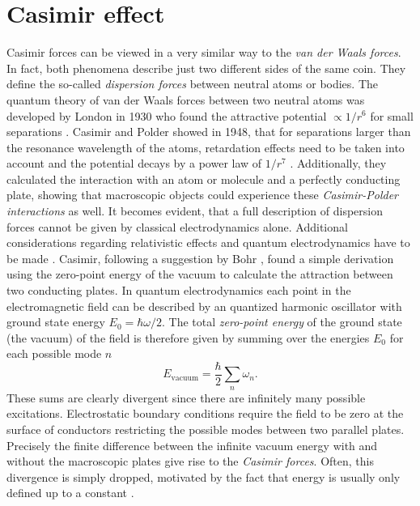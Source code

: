 \chapter{Casimir effect}\label{cha:casimir-effect}

Casimir forces can be viewed in a very similar way to the \textit{van der Waals forces}. In fact, both phenomena describe just two different sides of the same coin. They define the so-called \emph{dispersion forces} between neutral atoms or bodies.
The quantum theory of van der Waals forces between two neutral atoms was developed by London in 1930 who found the attractive potential $\propto 1/r^6$ for small separations \cite{London_1930}.
Casimir and Polder showed in 1948, that for separations larger than the resonance wavelength of the atoms, retardation effects need to be taken into account and the potential decays by a power law of $1/r^7$ \cite{Casimir_1948a}. 
Additionally, they calculated the interaction with an atom or molecule and a perfectly conducting plate, showing that macroscopic objects could experience these \emph{Casimir-Polder interactions} as well.
It becomes evident, that a full description of dispersion forces cannot be given by classical electrodynamics alone. Additional considerations regarding relativistic effects and quantum electrodynamics have to be made \cite{Bordag_2001,Klimchitskaya_2009,Lamoreaux_2004}.
Casimir, following a suggestion by Bohr \cite{Bordag_1999}, found a simple derivation using the zero-point energy of the vacuum to calculate the attraction between two conducting plates.
In quantum electrodynamics each point in the electromagnetic field can be described by an quantized harmonic oscillator with ground state energy $E_0 = \hbar\omega/2$.
The total \textit{zero-point energy} of the ground state (the vacuum) of the field is therefore given by summing over the energies $E_0$ for each possible mode $n$
\begin{equation}
  E_\mathrm{vacuum} = \frac{\hbar}{2} \sum_n \omega_n.
\end{equation} 
These sums are clearly divergent since there are infinitely many possible excitations.
Electrostatic boundary conditions require the field to be zero at the surface of conductors restricting the possible modes between two parallel plates.
Precisely the finite difference between the infinite vacuum energy with and without the macroscopic plates give rise to the \emph{Casimir forces}.
Often, this divergence is simply dropped, motivated by the fact that energy is usually only defined up to a constant \cite{Bordag_2001}. 
